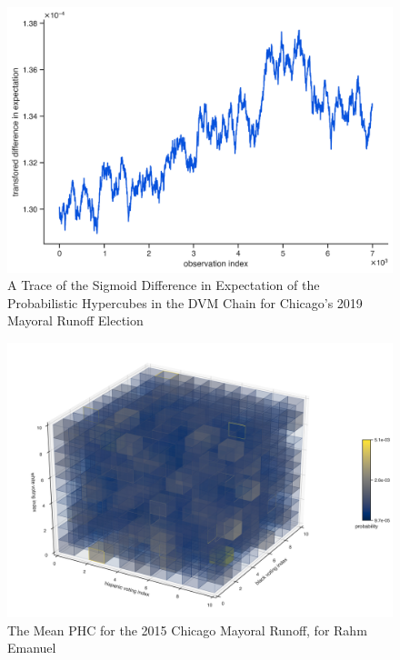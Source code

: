 \begin{figure}[ht]\centering
 \includegraphics[width=\linewidth]{figures/cm_2019_ward_trace_plot.png}
 \caption{A Trace of the Sigmoid Difference in Expectation of the Probabilistic Hypercubes in the DVM Chain for Chicago's 2019 Mayoral Runoff Election}
 \label{fig:chi_cm_2019_trace}
\end{figure}

\begin{figure}[ht]\centering
 \includegraphics[width=\linewidth]{figures/cm_2015_mean_phc.png}
 \caption{The Mean PHC for the 2015 Chicago Mayoral Runoff, for Rahm Emanuel}
 \label{fig:cm_2015_mean_phc}
\end{figure}

